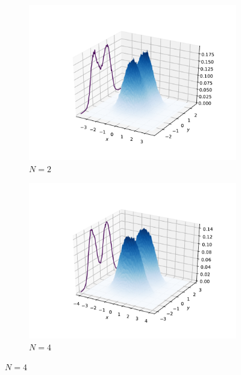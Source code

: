 \documentclass[../main.tex]{subfiles}
\begin{document}
\begin{figure}[!ht]
\centering
\begin{subfigure}{0.48\textwidth}
\includegraphics[width=\linewidth]{figures/densityDHO/density3D_DHO_N2_Omega1_2d}
\caption{$N=2$} \label{fig:DHO_density3D_a}
\end{subfigure}\hspace*{\fill}
\begin{subfigure}{0.48\textwidth}
\includegraphics[width=\linewidth]{figures/densityDHO/density3D_DHO_N4_Omega1_2d}
\caption{$N=4$} \label{fig:DHO_density3D_b}
\end{subfigure}


\end{figure}
\end{document}
